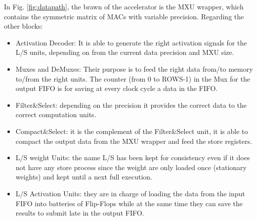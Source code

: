 In Fig. \ref{fig:datapath}, the brawn of the accelerator is the MXU wrapper, which contains the symmetric matrix of MACs with variable precision. Regarding the other blocks:
\begin{itemize}
\item Activation Decoder: It is able to generate the right activation signals for the L/S units, depending on from the current data precision and MXU size.
\item Muxes and DeMuxes: Their purpose is to feed the right data from/to memory to/from the right units. The counter (from 0 to ROWS-1) in the Mux for the output FIFO is for saving at every clock cycle a data in the FIFO.
\item Filter\&Select: depending on the precision it provides the correct data to the correct computation units.
\item Compact\&Select: it is the complement of the Filter\&Select unit, it is able to compact the output data from the MXU wrapper and feed the store registers.
\item L/S weight Units: the name L/S has been kept for consistency even if it does not have any store process since the weight are only loaded once (stationary weights) and kept until a next full execution. 
\item L/S Activation Units: they are in charge of loading the data from the input FIFO into batteries of Flip-Flops while at the same time they can save the results to submit late in the output FIFO.
\end{itemize}

